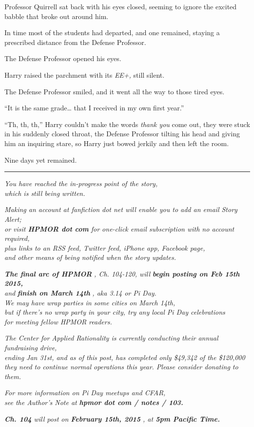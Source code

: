 Professor Quirrell sat back with his eyes closed, seeming to ignore the
excited babble that broke out around him.

In time most of the students had departed, and one remained, staying a
prescribed distance from the Defense Professor.

The Defense Professor opened his eyes.

Harry raised the parchment with its \emph{EE+,} still silent.

The Defense Professor smiled, and it went all the way to those tired
eyes.

``It is the same grade\ldots{} that I received in my own first year.''

``Th, th, th,'' Harry couldn't make the words \emph{thank you} come out,
they were stuck in his suddenly closed throat, the Defense Professor
tilting his head and giving him an inquiring stare, so Harry just bowed
jerkily and then left the room.

Nine days yet remained.

\begin{center}\rule{3in}{0.4pt}\end{center}

\emph{You have reached the in-progress point of the story,\\}
\emph{which is still being written.}

\emph{Making an account at fanfiction dot net will enable you to add an
email Story Alert;}\\ \emph{or visit \textbf{HPMOR dot com} for
one-click email subscription with no account required,}\\ \emph{plus
links to an RSS feed, Twitter feed, iPhone app, Facebook page,}\\
\emph{and other means of being notified when the story updates.}

\textbf{\emph{The final arc of HPMOR}} \emph{, Ch. 104-120, will}
\textbf{\emph{begin posting on Feb 15th 2015,}}\\ \emph{and}
\textbf{\emph{finish on March 14th}} \emph{, aka 3.14 or Pi Day.}\\
\emph{We may have wrap parties in some cities on March 14th,}\\
\emph{but if there's no wrap party in your city, try any local Pi Day
celebrations}\\ \emph{for meeting fellow HPMOR readers.}

\emph{The Center for Applied Rationality is currently conducting their
annual fundraising drive,\\ ending Jan 31st, and as of this post, has
completed only \$49,342 of the \$120,000\\ they need to continue normal
operations this year. Please consider donating to them.}

\emph{For more information on Pi Day meetups and CFAR,}\\ \emph{see the
Author's Note at} \textbf{\emph{hpmor dot com / notes / 103.}}

\emph{\textbf{Ch. 104} will post on \textbf{February 15th, 2015} , at
\textbf{5pm Pacific Time.}}
